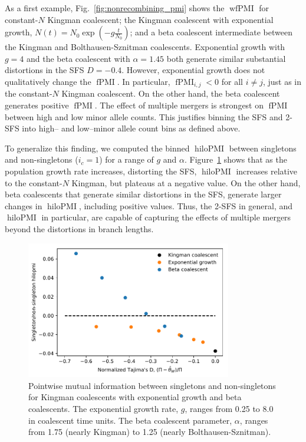 \documentclass[11pt, letterpaper]{article}   	%
\newcommand{\fig}[1]{Fig.~\ref{#1}}
\newcommand{\Fig}[1]{Figure~\ref{#1}}
\DeclareMathOperator{\fpmi}{fPMI}
\DeclareMathOperator{\wfpmi}{wfPMI}
\DeclareMathOperator{\hilopmi}{hiloPMI}
\begin{document}
As a first example, \fig{fig:nonrecombining_pmi} shows the $\wfpmi$ for constant-$N$ Kingman coalescent; the Kingman coalescent with exponential growth, $N(t)=N_0 \exp(-g \frac{t}{N_0})$; and a beta coalescent intermediate between the Kingman and Bolthausen-Sznitman coalescents.
Exponential growth with $g=4$ and the beta coalescent with $\alpha=1.45$ both generate similar substantial distortions in the SFS $D = -0.4$.
However, exponential growth does not qualitatively change the $\fpmi$.
In particular, $\fpmi_{i,j} < 0$ for all $i \neq j$, just as in the constant-$N$ Kingman coalescent.
On the other hand, the beta coalescent generates positive $\fpmi$.
The effect of multiple mergers is strongest on $\fpmi$ between high and low minor allele counts.
This justifies binning the SFS and 2-SFS into high-- and low--minor allele count bins as defined above.

To generalize this finding, we computed the binned $\hilopmi$ between singletons and non-singletons ($i_c = 1$) for a range of $g$ and $\alpha$.
\Fig{fig:fpmi_vs_tajimasd} shows that as the population growth rate increases, distorting the SFS, $\hilopmi$ increases relative to the constant-$N$ Kingman, but plateaus at a negative value.
On the other hand, beta coalescents that generate similar distortions in the SFS, generate larger changes in $\hilopmi$, including positive values.
Thus, the 2-SFS in general, and $\hilopmi$ in particular, are capable of capturing the effects of multiple mergers beyond the distortions in branch lengths.

\begin{figure}
\centering
\includegraphics[width=0.8\textwidth]{figures/hilopmi_vs_tajimasD_no_recombination.pdf}
\caption{Pointwise mutual information between singletons and non-singletons for Kingman coalescents with exponential growth and beta coalescents. The exponential growth rate, $g$, ranges from 0.25 to 8.0 in coalescent time units. The beta coalescent parameter, $\alpha$, ranges from 1.75 (nearly Kingman) to 1.25 (nearly Bolthausen-Sznitman). \label{fig:fpmi_vs_tajimasd}}
\end{figure}
\end{document}
